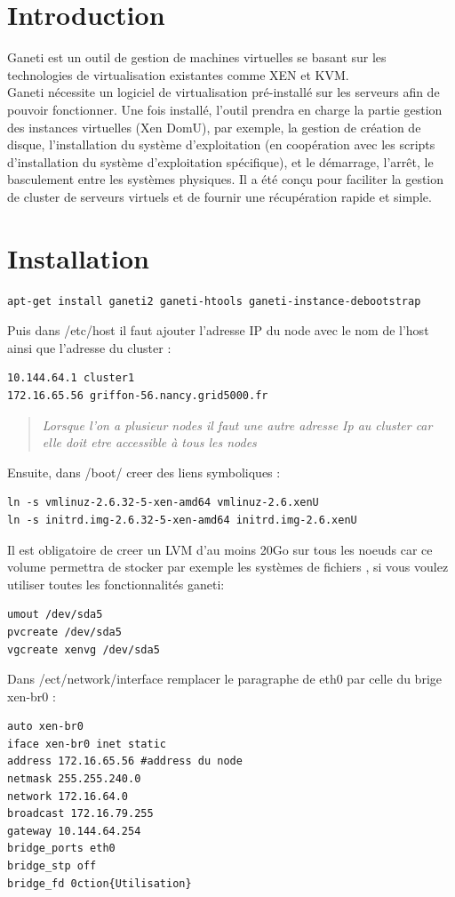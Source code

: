 \documentclass[a4paper,11pt]{report}
\begin{document}
      \section{Introduction}
Ganeti est un outil de gestion de machines virtuelles se basant sur les technologies de virtualisation existantes comme XEN et KVM.\\
Ganeti nécessite un logiciel de virtualisation pré-installé sur les serveurs afin de pouvoir fonctionner. Une fois installé, 
l'outil prendra en charge la partie gestion des instances virtuelles (Xen DomU), par exemple, la gestion de création de disque, 
l'installation du système d'exploitation (en coopération avec les scripts d'installation du système d'exploitation 
spécifique), et le démarrage, l'arrêt, le basculement entre les systèmes physiques. Il a été conçu pour faciliter la gestion de 
cluster de serveurs virtuels et de fournir une récupération rapide et simple.
      \section{Installation}
\begin{lstlisting}
apt-get install ganeti2 ganeti-htools ganeti-instance-debootstrap
\end{lstlisting}
Puis dans /etc/host il faut ajouter l'adresse IP du node avec le nom de l'host ainsi que l'adresse du cluster :\\
\begin{lstlisting}
10.144.64.1 cluster1
172.16.65.56 griffon-56.nancy.grid5000.fr
\end{lstlisting}
\begin{quotation}
\textit{Lorsque l'on a plusieur nodes il faut une autre adresse Ip au cluster car elle doit etre accessible à tous les nodes\\}
\end{quotation}
Ensuite, dans /boot/ creer des liens symboliques :
\begin{lstlisting}
ln -s vmlinuz-2.6.32-5-xen-amd64 vmlinuz-2.6.xenU
ln -s initrd.img-2.6.32-5-xen-amd64 initrd.img-2.6.xenU
\end{lstlisting}
Il est obligatoire de creer un LVM d'au moins 20Go sur tous les noeuds car ce volume permettra de stocker par exemple les systèmes de fichiers 
, si vous voulez utiliser toutes les fonctionnalités ganeti:\\
\begin{lstlisting}
umout /dev/sda5
pvcreate /dev/sda5
vgcreate xenvg /dev/sda5
\end{lstlisting}
Dans /ect/network/interface remplacer le paragraphe de eth0 par celle du brige xen-br0 :
\begin{lstlisting}
auto xen-br0
iface xen-br0 inet static
address 172.16.65.56 #address du node
netmask 255.255.240.0 
network 172.16.64.0
broadcast 172.16.79.255
gateway 10.144.64.254
bridge_ports eth0
bridge_stp off
bridge_fd 0ction{Utilisation}
\end{lstlisting}
\end{document}
